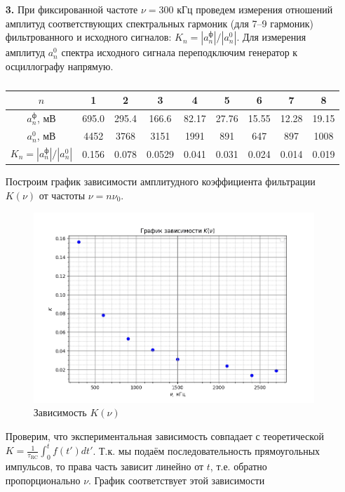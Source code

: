 \documentclass[a4paper,12pt]{article} %
\begin{document}
\begin{enumerate}
	\item [\textbf{3.}]
	      При фиксированной частоте $\nu = 300$ кГц проведем измерения отношений амплитуд соответствующих спектральных гармоник (для 7–9 гармоник) фильтрованного и исходного сигналов: $K_n = |a_n^\text{ф}|/|a_n^0|$. Для измерения
	      амплитуд $a_n^0$ спектра исходного сигнала переподключим генератор к осциллографу напрямую.

	      \begin{table}[h!]
		      \centering
		      \begin{tabular}{|c|c|c|c|c|c|c|c|c|}
			      \hline
			      $n$                            & 1     & 2     & 3      & 4     & 5     & 6     & 7     & 8     \\ \hline
			      $a_n^\text{ф}$, мВ             & 695.0 & 295.4 & 166.6  & 82.17 & 27.76 & 15.55 & 12.28 & 19.15 \\ \hline
			      $a_n^0$, мВ                    & 4452  & 3768  & 3151   & 1991  & 891   & 647   & 897   & 1008  \\ \hline
			      $K_n = |a_n^\text{ф}|/|a_n^0|$ & 0.156 & 0.078 & 0.0529 & 0.041 & 0.031 & 0.024 & 0.014 & 0.019 \\ \hline
		      \end{tabular}
		      \caption{}
		      \label{table4}
	      \end{table}

	      Построим график зависимости амплитудного коэффициента фильтрации $K(\nu)$ от частоты $\nu = n\nu_0$.
	      \begin{figure}[h]
		      \centering
		      \includegraphics[width=0.7\linewidth]{K(nu).png}
		      \caption{Зависимость $K(\nu)$}
		      \label{grafic3}
	      \end{figure}





	      Проверим, что экспериментальная зависимость
	      совпадает с теоретической $K = \frac{1}{\tau_\text{RC}} \int_0^t f(t')dt'$. Т.к. мы подаём последовательность прямоугольных импульсов, то права часть зависит линейно от $t$, т.е. обратно пропорционально $\nu$. График соответствует этой зависимости

\end{enumerate}
\end{document}
